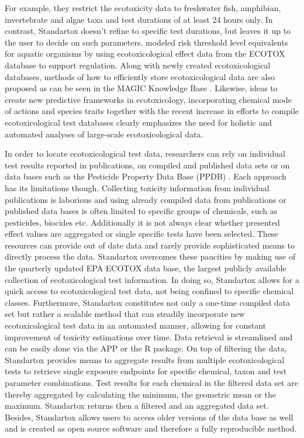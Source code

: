 For example, they restrict the ecotoxicity data to freshwater fish, amphibian, invertebrate and algae taxa and test durations of at least 24 hours only. In contrast, Standartox doesn't refine to specific test durations, but leaves it up to the user to decide on such parameters.
\citet{petschick_modeling_2019} modeled risk threshold level equivalents for aquatic organisms by using ecotoxicological effect data from the ECOTOX database to support regulation. Along with newly created ecotoxicological databases, methods of how to efficiently store ecotoxicological data are also proposed as can be seen in the MAGIC Knowledge Base \citep{bub_graphing_2019}. Likewise, ideas to create new predictive frameworks in ecotoxicology, incorporating chemical mode of actions and species traits \citep{vandenberg_modeling_2019} together with the recent increase in efforts to compile ecotoxicological test databases clearly emphasizes the need for holistic and automated analyses of large-scale ecotoxicological data.

In order to locate ecotoxicological test data, researchers can rely on individual test results reported in publications, on compiled and published data sets \citep{malaj_organic_2014, morrissey_neonicotinoid_2015} or on data bases such as the Pesticide Property Data Base (PPDB) \citep{lewis_international_2016}. Each approach has its limitations though. Collecting toxicity information from individual publications is laborious and using already compiled data from publications or published data bases is often limited to specific groups of chemicals, such as pesticides, biocides etc. Additionally it is not always clear whether presented effect values are aggregated or single specific tests have been selected. These resources can provide out of date data and rarely provide sophisticated means to directly process the data. Standartox overcomes these paucities by making use of the quarterly updated EPA ECOTOX data base, the largest publicly available collection of ecotoxicological test information. In doing so, Standartox allows for a quick access to ecotoxicological test data, not being confined to specific chemical classes. Furthermore, Standartox constitutes not only a one-time compiled data set but rather a scalable method that can steadily incorporate new ecotoxicological test data in an automated manner, allowing for constant improvement of toxicity estimations over time. Data retrieval is streamlined and can be easily done via the APP or the R package. On top of filtering the data, Standartox provides means to aggregate results from multiple ecotoxicological tests to retrieve single exposure endpoints for specific chemical, taxon and test parameter combinations. Test results for each chemical in the filtered data set are thereby aggregated by calculating the minimum, the geometric mean or the maximum. Standartox returns then a filtered and an aggregated data set. Besides, Standartox allows users to access older versions of the data base as well and is created as open source software and therefore a fully reproducible method.

